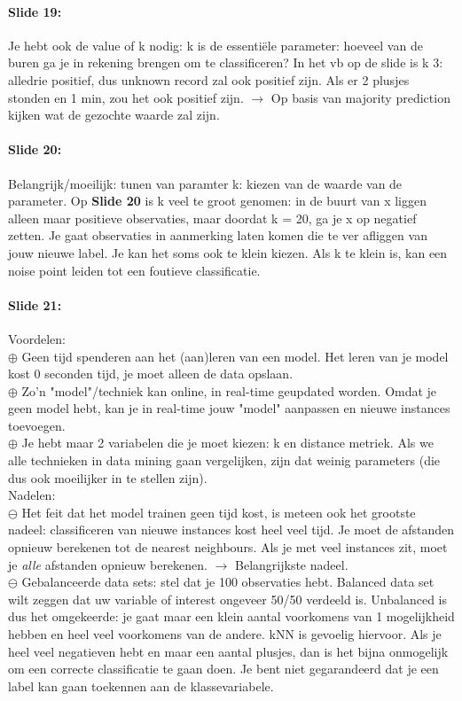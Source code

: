 \documentclass[10pt,a4paper]{report}
\begin{document}
\paragraph{Slide 19:}Je hebt ook de value of k nodig: k is de essentiële parameter: hoeveel van de buren ga je in rekening brengen om te classificeren? In het vb op de slide is k 3: alledrie positief, dus unknown record zal ook positief zijn. Als er 2 plusjes stonden en 1 min, zou het ook positief zijn. $\rightarrow$ Op basis van majority prediction kijken wat de gezochte waarde zal zijn.

\paragraph{Slide 20:}Belangrijk/moeilijk: tunen van paramter k: kiezen van de waarde van de parameter. Op \textbf{Slide 20} is k veel te groot genomen: in de buurt van x liggen alleen maar positieve observaties, maar doordat k = 20, ga je x op negatief zetten. Je gaat observaties in aanmerking laten komen die te ver afliggen van jouw nieuwe label. Je kan het soms ook te klein kiezen. Als k te klein is, kan een noise point leiden tot een foutieve classificatie.

\paragraph{Slide 21:}Voordelen:\\
$\oplus$ Geen tijd spenderen aan het (aan)leren van een model. Het leren van je model kost 0 seconden tijd, je moet alleen de data opslaan.\\
$\oplus$ Zo'n "model"/techniek kan online, in real-time geupdated worden. Omdat je geen model hebt, kan je in real-time jouw "model" aanpassen en nieuwe instances toevoegen.\\
$\oplus$ Je hebt maar 2 variabelen die je moet kiezen: k en distance metriek. Als we alle technieken in data mining gaan vergelijken, zijn dat weinig parameters (die dus ook moeilijker in te stellen zijn).\\
Nadelen:\\
$\ominus$ Het feit dat het model trainen geen tijd kost, is meteen ook het grootste nadeel: classificeren van nieuwe instances kost heel veel tijd. Je moet de afstanden opnieuw berekenen tot de nearest neighbours. Als je met veel instances zit, moet je \emph{alle} afstanden opnieuw berekenen. $\rightarrow$ Belangrijkste nadeel.\\
$\ominus$ Gebalanceerde data sets: stel dat je 100 observaties hebt. Balanced data set wilt zeggen dat uw variable of interest ongeveer 50/50 verdeeld is. Unbalanced is dus het omgekeerde: je gaat maar een klein aantal voorkomens van 1 mogelijkheid hebben en heel veel voorkomens van de andere. kNN is gevoelig hiervoor. Als je heel veel negatieven hebt en maar een aantal plusjes, dan is het bijna onmogelijk om een correcte classificatie te gaan doen. Je bent niet gegarandeerd dat je een label kan gaan toekennen aan de klassevariabele.
\end{document}
